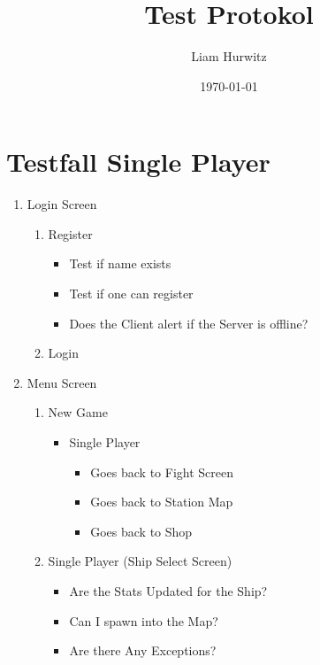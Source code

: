 \documentclass[11pt]{article}
\author{Liam Hurwitz}
\date{\today}
\title{Test Protokol}
\begin{document}
\maketitle
\tableofcontents


\section{Testfall Single Player}
\label{sec:orgc5dc561}
\begin{enumerate}
\item Login Screen
\begin{enumerate}
\item Register
\begin{itemize}
\item Test if name exists
\item Test if one can register
\item Does the Client alert if the Server is offline?
\end{itemize}
\item Login
\end{enumerate}
\item Menu Screen
\begin{enumerate}
\item New Game
\begin{itemize}
\item Single Player
\begin{itemize}
\item Goes back to Fight Screen
\item Goes back to Station Map
\item Goes back to Shop
\end{itemize}
\end{itemize}
\item Single Player (Ship Select Screen)
\begin{itemize}
\item Are the Stats Updated for the Ship?
\item Can I spawn into the Map?
\item Are there Any Exceptions?
\end{itemize}
\end{enumerate}
\end{enumerate}
\end{document}
